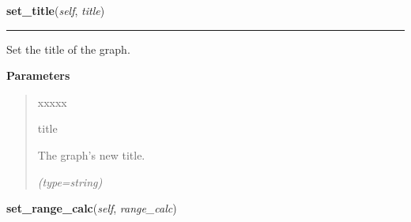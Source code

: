     \vspace{0.5ex}

\hspace{.8\funcindent}\begin{boxedminipage}{\funcwidth}

    \raggedright \textbf{set\_title}(\textit{self}, \textit{title})

    \vspace{-1.5ex}

    \rule{\textwidth}{0.5\fboxrule}
\setlength{\parskip}{2ex}
    Set the title of the graph.

\setlength{\parskip}{1ex}
      \textbf{Parameters}
      \vspace{-1ex}

      \begin{quote}
        \begin{Ventry}{xxxxx}

          \item[title]

          The graph's new title.

            {\it (type=string)}

        \end{Ventry}

      \end{quote}

    \end{boxedminipage}

    \label{pygtk_chart:line_chart:Graph:set_range_calc}

    \vspace{0.5ex}

\hspace{.8\funcindent}\begin{boxedminipage}{\funcwidth}

    \raggedright \textbf{set\_range\_calc}(\textit{self}, \textit{range\_calc})

\setlength{\parskip}{2ex}
\setlength{\parskip}{1ex}
    \end{boxedminipage}

    \label{pygtk_chart:line_chart:Graph:get_color}

